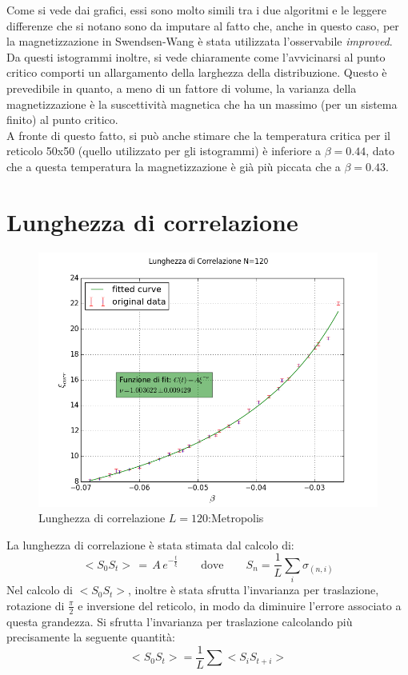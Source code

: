 Come si vede dai grafici, essi sono molto simili tra i due algoritmi e le leggere differenze che si notano sono da imputare al fatto che, anche in questo caso, per la magnetizzazione in Swendsen-Wang è stata utilizzata l'osservabile \emph{improved}.\\
Da questi istogrammi inoltre, si vede chiaramente come l'avvicinarsi al punto critico comporti un allargamento della larghezza della distribuzione. Questo è prevedibile in quanto, a meno di un fattore di volume, la varianza della magnetizzazione è la suscettività magnetica che ha un massimo (per un sistema finito) al punto critico.\\
A fronte di questo fatto, si può anche stimare che la temperatura critica per il reticolo 50x50 (quello utilizzato per gli istogrammi) è inferiore a $\beta=0.44$, dato che a questa temperatura la magnetizzazione è già più piccata che a $\beta=0.43$.


\newpage

\section{Lunghezza di correlazione}
\begin{figure}[h]
\centering
	\includegraphics[scale=0.5]{metropolis/cor120.png}
\caption{Lunghezza di correlazione $L=120$:Metropolis}
\end{figure}


La lunghezza di correlazione è stata stimata dal calcolo di:
$$
	<S_0 S_t > \, = \, A \, e^{-\frac{t}{\xi}} \qquad \mbox{dove} \qquad S_n = \frac{1}{L} \sum_i \sigma_{(n,i)} 
$$
Nel calcolo di $<S_0 S_t>$, inoltre è stata sfrutta l'invarianza per traslazione, rotazione di $\frac{\pi}{2}$ e inversione del reticolo, in modo da diminuire l'errore associato a questa grandezza.
Si sfrutta l'invarianza per traslazione calcolando più precisamente la seguente quantità:
$$
	<S_0 S_t> = \frac{1}{L} \sum <S_i S_{t+i}>
$$ 

